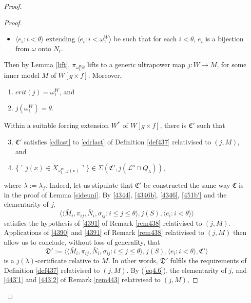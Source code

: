 \documentclass[12pt, twoside]{memoir}
\numberwithin{equation}{section}
\theoremstyle{definition}
\theoremstyle{remark}
\theoremstyle{definition}
\theoremstyle{definition}
\theoremstyle{definition}
\theoremstyle{remark}
\begin{document}
\begin{proof}
\begin{proof}
\begin{itemize}
    \item $\langle e_i : i < \theta \rangle$ extending $\langle e_i : i < \omega_1^W \rangle$ be such that for each $i < \theta$, $e_i$ is a bijection from $\omega$ onto $N_i$.
\end{itemize}
Then by Lemma \ref{lift}, $\pi_{\omega_1^W\theta}$ lifts to a generic ultrapower map $j : W \longrightarrow M$, for some inner model $M$ of $W[g \times f]$. Moreover, 
\begin{enumerate}[label=(\alph*)]
    \item\label{451a'} $crit(j) = \omega_1^W$, and
    \item\label{451b'} $j(\omega_1^W) = \theta$.
\end{enumerate}

Within a suitable forcing extension $W^*$ of $W[g \times f]$, there is $\mathfrak{C}'$ such that 
\begin{enumerate}[label=(\alph*)]
    \setcounter{enumi}{2}
    \item $\mathfrak{C}'$ satisfies \ref{cdlast} to \ref{cdrlast} of Definition \ref{def437} relativised to $(j, M)$, and
    \item $\{\ulcorner j(x) \in \dot{X}_{\omega_1^W, j(\nu)} \urcorner\} \in \Sigma(\mathfrak{C}', j(\mathcal{L}^o \cap Q_{\lambda}))$,
\end{enumerate} 
where $\lambda := \lambda_f$. Indeed, let us stipulate that $\mathfrak{C}'$ be constructed the same way $\mathfrak{C}$ is in the proof of Lemma \ref{sideuni}. By \ref{4344}, \ref{4346b}, \ref{4346}, \ref{451b'} and the elementarity of $j$, 
\begin{equation*}
    \langle \langle \bar{M}_i, \pi_{ij}, \bar{N}_i, \sigma_{ij} : i \leq j \leq \theta \rangle, j(S), \langle e_i : i < \theta \rangle \rangle
\end{equation*}
satisfies the hypothesis of \ref{4391} of Remark \ref{rem438} relativised to $(j, M)$. Applications of \ref{4390} and \ref{4391} of Remark \ref{rem438} relativised to $(j, M)$ then allow us to conclude, without loss of generality, that
\begin{equation*}
    \mathfrak{D}' := \langle \langle \bar{M}_i, \pi_{ij}, \bar{N}_i, \sigma_{ij} : i \leq j \leq \theta \rangle, j(S), \langle e_i : i < \theta \rangle, \mathfrak{C}' \rangle
\end{equation*}
is a $j(\lambda)$-certificate relative to $M$. In other words, $\mathfrak{D}'$ fulfils the requirements of Definition \ref{def437} relativised to $(j, M)$. By (\ref{eq4.6}), the elementarity of $j$, and \ref{443'1} and \ref{443'2} of Remark \ref{rem443} relativised to $(j, M)$, 

\end{proof}
\end{proof}
\end{document}
